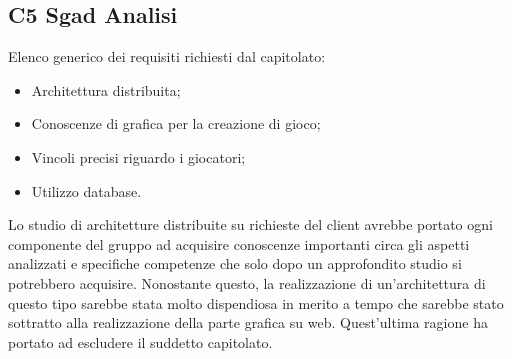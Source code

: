 \subsection{C5 Sgad Analisi}
Elenco generico dei requisiti richiesti dal capitolato:
\begin{itemize} 
\item Architettura distribuita;
\item Conoscenze di grafica per la creazione di gioco;
\item Vincoli precisi riguardo i giocatori;
\item Utilizzo database.
\end{itemize}
Lo studio di architetture distribuite su richieste del client avrebbe portato ogni componente del gruppo ad acquisire conoscenze importanti circa gli aspetti analizzati e specifiche competenze che solo dopo un approfondito studio si potrebbero acquisire. Nonostante questo, la realizzazione di un'architettura di questo tipo sarebbe stata molto dispendiosa in merito a tempo che sarebbe stato sottratto alla realizzazione della parte grafica su web. Quest'ultima ragione ha portato ad escludere il suddetto capitolato.\\